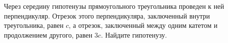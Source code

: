 \begin{ex}
	\begin{condition}
		Через середину гипотенузы прямоугольного треугольника проведен к ней перпендикуляр. Отрезок этого перпендикуляра, заключенный внутри треугольника, равен \( c \), а отрезок, заключенный между одним катетом и продолжением	другого, равен \( 3c \). Найдите гипотенузу.
	\end{condition}
\end{ex}